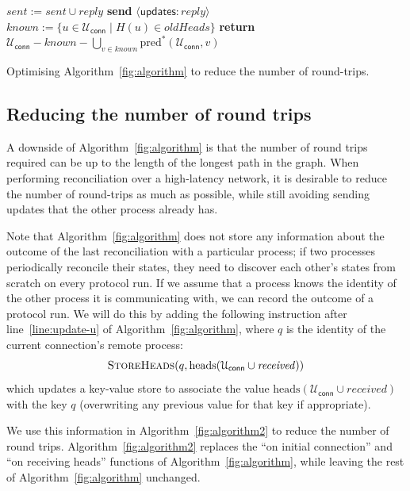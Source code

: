 \documentclass[a4paper,anonymous,USenglish]{lipics-v2019}
\begin{document}
\begin{algorithm}[t]
\begin{algorithmic}[1]
            \State $\mathit{sent} := \mathit{sent} \cup \mathit{reply}$
            \State \textbf{send} $\langle\mathsf{updates}: \mathit{reply}\rangle$ \label{line:a2-heads-reply}
        \EndIf
        \State {} \label{line:a2-heads-missing}
    \EndOn
    \State
        \State $\mathit{known} := \{u \in \mathcal{U}_\mathsf{conn} \mid H(u) \in \mathit{oldHeads}\}$
        \State \textbf{return} $\mathcal{U}_\mathsf{conn} - \mathit{known} - \bigcup_{v \in \mathit{known}} \mathrm{pred}^*(\mathcal{U}_\mathsf{conn}, v)$
    \EndFunction
    \end{algorithmic}
    \caption{Optimising Algorithm~\ref{fig:algorithm} to reduce the number of round-trips.}\label{fig:algorithm2}
\end{algorithm}

\subsection{Reducing the number of round trips}\label{sec:algorithm2}

A downside of Algorithm~\ref{fig:algorithm} is that the number of round trips required can be up to the length of the longest path in the graph.
When performing reconciliation over a high-latency network, it is desirable to reduce the number of round-trips as much as possible, while still avoiding sending updates that the other process already has.

Note that Algorithm~\ref{fig:algorithm} does not store any information about the outcome of the last reconciliation with a particular process; if two processes periodically reconcile their states, they need to discover each other's states from scratch on every protocol run.
If we assume that a process knows the identity of the other process it is communicating with, we can record the outcome of a protocol run.
We will do this by adding the following instruction after line~\ref{line:update-u} of Algorithm~\ref{fig:algorithm}, where $q$ is the identity of the current connection's remote process:
\[ \textsc{StoreHeads}(q, \mathrm{heads}(\mathcal{U}_\mathsf{conn} \cup \mathit{received})) \]
which updates a key-value store to associate the value $\mathrm{heads}(\mathcal{U}_\mathsf{conn} \cup \mathit{received})$ with the key $q$ (overwriting any previous value for that key if appropriate).

We use this information in Algorithm~\ref{fig:algorithm2} to reduce the number of round trips.
Algorithm~\ref{fig:algorithm2} replaces the ``on initial connection'' and ``on receiving heads'' functions of Algorithm~\ref{fig:algorithm}, while leaving the rest of Algorithm~\ref{fig:algorithm} unchanged.
\end{document}
